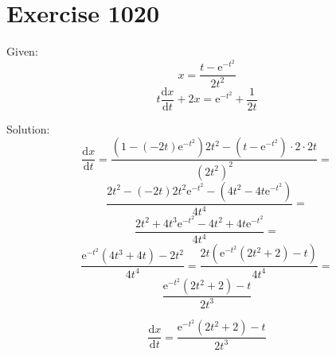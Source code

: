 \documentclass[a4paper, 10pt]{scrartcl}
\newcommand*\deriv{\mathrm{d}}
\newcommand*\euler{\mathrm{e}}
\begin{document}
\section{Exercise 1020}

Given:
\[
x = \frac{t - \euler^{-t^{2}}}{2t^{2}}
\]
\[
t\frac{\deriv x}{\deriv t} + 2x = \euler^{-t^{2}} + \frac{1}{2t}
\]

Solution:
\[
\frac{\deriv x}{\deriv t} = \frac{(1 - (-2t)\euler^{-t^{2}})2t^{2} - (t - \euler^{-t^{2}})\cdot 2\cdot 2t}{(2t^{2})^{2}} =
\]
\[
\frac{2t^{2} - (-2t)2t^{2}\euler^{-t^{2}} - (4t^{2} - 4t\euler^{-t^{2}})}{4t^{4}} =
\]
\[
\frac{2t^{2} + 4t^{3}\euler^{-t^{2}} - 4t^{2} + 4t\euler^{-t^{2}}}{4t^{4}} =
\]
\[
\frac{\euler^{-t^{2}}(4t^{3} + 4t) - 2t^{2}}{4t^{4}} = \frac{2t(\euler^{-t^{2}}(2t^{2} + 2) - t)}{4t^{4}} =
\]
\[
\frac{\euler^{-t^{2}}(2t^{2} + 2) - t}{2t^{3}}
\]

\[
\frac{\deriv x}{\deriv t} = \frac{\euler^{-t^{2}}(2t^{2} + 2) - t}{2t^{3}}
\]
\end{document}
